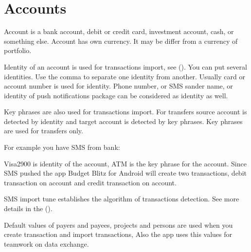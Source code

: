 \documentclass[a4paper,10pt,english]{sphinxmanual}
\begin{document}
\section{Accounts}
\label{\detokenize{directories:accounts}}
Account is a bank account, debit or credit card, investment account, cash, or something else.
Account has own currency. It may be differ from a currency of portfolio.

Identity of an account is used for transactions import, see {\hyperref[\detokenize{import:chapter-import}]{}} ().
You can put several identities. Use the comma to separate one identity from another.
Usually card or account number is used for identity. Phone number, or SMS sander name,
or identity of push notifications package can be considered as identity as well.

Key phrases are also used for transactions import. For transfers source account is detected by identity
and target account is detected by key phrases. Key phrases are used for transfers only.

For example you have SMS from bank:

\begin{sphinxVerbatim}[commandchars=\\\{\}]
           
\end{sphinxVerbatim}

Visa2900 is identity of the  account, ATM is the key phrase for the  account.
Since SMS pushed the app Budget Blitz for Android will create two transactions, debit transaction on  account
and credit transaction on  account.

SMS import tune establishes the algorithm of transactions detection. See more details in the {\hyperref[\detokenize{notifications:chapter-notifications}]{}} ().

Default values of payers and payees, projects and persons are used when you create transaction
and import transactions, Also the app uses this values for teamwork on data exchange.
\end{document}
